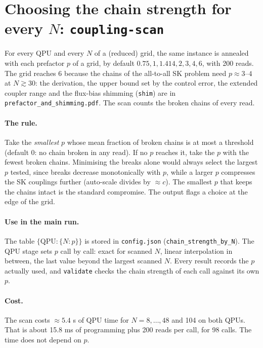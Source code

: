 \documentclass[11pt,a4paper]{article}
\newcommand{\code}[1]{\nolinkurl{#1}}
\newcommand{\src}[4]{}
\begin{document}
\section{Choosing the chain strength for every $N$: \texorpdfstring{\code{coupling-scan}}{coupling-scan}}
For every QPU and every $N$ of a (reduced) grid, the same instance is annealed with each prefactor $p$ of a grid, by default $0.75,1,1.414,2,3,4,6$, with 200 reads. The grid reaches 6 because the chains of the all-to-all SK problem need $p\approx3$--$4$ at $N\gtrsim30$: the derivation, the upper bound set by the control error, the extended coupler range and the flux-bias shimming (\code{shim}) are in \code{prefactor_and_shimming.pdf}. The scan counts the broken chains of every read.

\paragraph{The rule.} Take the \emph{smallest} $p$ whose mean fraction of broken chains is at most a threshold (default 0: no chain broken in any read). If no $p$ reaches it, take the $p$ with the fewest broken chains. Minimising the breaks alone would always select the largest $p$ tested, since breaks decrease monotonically with $p$, while a larger $p$ compresses the SK couplings further (auto-scale divides by $\approx c$). The smallest $p$ that keeps the chains intact is the standard compromise. The output flags a choice at the edge of the grid.
\src{dwave_utils/coupling_scan.py}{\rChooseA}{\rChooseB}{the choice of $p$}
\paragraph{Use in the main run.} The table $\{\text{QPU}:\{N:p\}\}$ is stored in \code{config.json} (\code{chain_strength_by_N}). The QPU stage sets $p$ call by call: exact for scanned $N$, linear interpolation in between, the last value beyond the largest scanned $N$. Every result records the $p$ actually used, and \code{validate} checks the chain strength of each call against its own $p$.
\src{dwave_utils/coupling_scan.py}{\rInterpA}{\rInterpB}{prefactor for a given $N$}
\paragraph{Cost.} The scan costs $\approx5.4$ s of QPU time for $N=8,\dots,48$ and 104 on both QPUs. That is about 15.8 ms of programming plus 200 reads per call, for 98 calls. The time does not depend on $p$.
\end{document}
